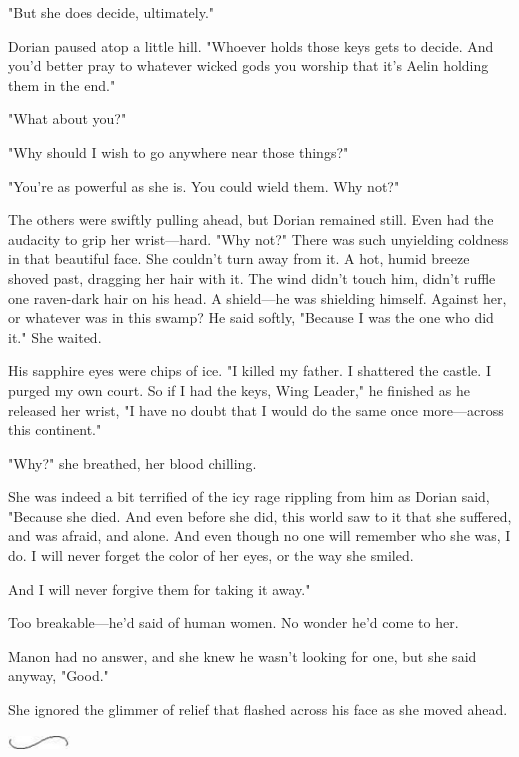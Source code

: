 "But she does decide, ultimately."

Dorian paused atop a little hill.
"Whoever holds those keys gets to decide.
And you'd better pray to whatever wicked gods you worship that it's Aelin holding them in the end."

"What about you?"

"Why should I wish to go anywhere near those things?"

"You're as powerful as she is.
You could wield them.
Why not?"

The others were swiftly pulling ahead, but Dorian remained still.
Even had the audacity to grip her wrist---hard.
"Why not?"
There was such unyielding coldness in that beautiful face.
She couldn't turn away from it.
A hot, humid breeze shoved past, dragging her hair with it.
The wind didn't touch him, didn't ruffle one raven-dark hair on his head.
A shield---he was shielding himself.
Against her, or whatever was in this swamp?
He said softly, "Because I was the one who did it."
She waited.

His sapphire eyes were chips of ice.
"I killed my father.
I shattered the castle.
I purged my own court.
So if I had the keys, Wing Leader," he finished as he released her wrist, "I have no doubt that I would do the same once more---across this continent."

"Why?"
she breathed, her blood chilling.

She was indeed a bit terrified of the icy rage rippling from him as Dorian said, "Because she died.
And even before she did, this world saw to it that she suffered, and was afraid, and alone.
And even though no one will remember who she was, I do.
I will never forget the color of her eyes, or the way she smiled.

And I will never forgive them for taking it away."

Too breakable---he'd said of human women.
No wonder he'd come to her.

Manon had no answer, and she knew he wasn't looking for one, but she said anyway, "Good."

She ignored the glimmer of relief that flashed across his face as she moved ahead.

\begin{center}
	\includegraphics[width=0.65in,height=0.13in]{images/seperator}
\end{center}

